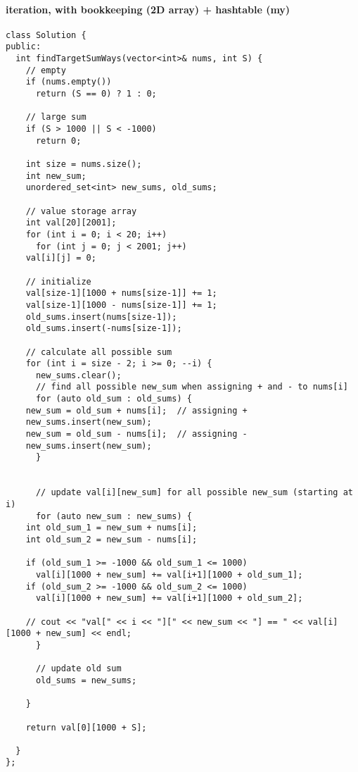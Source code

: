 \documentclass[11pt]{article}
\begin{document}
\paragraph{iteration, with bookkeeping (2D array) + hashtable (my)}
\label{sec:org0ddeb96}
\begin{verbatim}
class Solution {
public:
  int findTargetSumWays(vector<int>& nums, int S) {
    // empty 
    if (nums.empty())
      return (S == 0) ? 1 : 0;

    // large sum
    if (S > 1000 || S < -1000)
      return 0;

    int size = nums.size();
    int new_sum;
    unordered_set<int> new_sums, old_sums;

    // value storage array
    int val[20][2001];
    for (int i = 0; i < 20; i++)
      for (int j = 0; j < 2001; j++)
	val[i][j] = 0;

    // initialize
    val[size-1][1000 + nums[size-1]] += 1;
    val[size-1][1000 - nums[size-1]] += 1;
    old_sums.insert(nums[size-1]);
    old_sums.insert(-nums[size-1]);

    // calculate all possible sum
    for (int i = size - 2; i >= 0; --i) {
      new_sums.clear();
      // find all possible new_sum when assigning + and - to nums[i]
      for (auto old_sum : old_sums) {
	new_sum = old_sum + nums[i];  // assigning +
	new_sums.insert(new_sum);
	new_sum = old_sum - nums[i];  // assigning -
	new_sums.insert(new_sum);
      }


      // update val[i][new_sum] for all possible new_sum (starting at i)
      for (auto new_sum : new_sums) {
	int old_sum_1 = new_sum + nums[i];
	int old_sum_2 = new_sum - nums[i];

	if (old_sum_1 >= -1000 && old_sum_1 <= 1000)
	  val[i][1000 + new_sum] += val[i+1][1000 + old_sum_1];
	if (old_sum_2 >= -1000 && old_sum_2 <= 1000)
	  val[i][1000 + new_sum] += val[i+1][1000 + old_sum_2];

	// cout << "val[" << i << "][" << new_sum << "] == " << val[i][1000 + new_sum] << endl;
      }

      // update old sum
      old_sums = new_sums;

    }

    return val[0][1000 + S];

  }
};
\end{verbatim}
\end{document}
